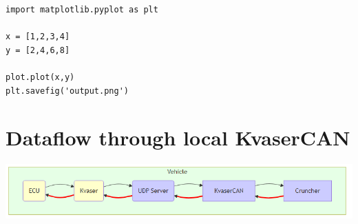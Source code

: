 \documentclass[a4paper, 11pt]{article}
\begin{document}
\begin{verbatim}
import matplotlib.pyplot as plt

x = [1,2,3,4]
y = [2,4,6,8]

plot.plot(x,y)
plt.savefig('output.png')
\end{verbatim}
\section{Dataflow through local KvaserCAN}
\label{sec:orgb2fbc14}

\begin{center}
\includegraphics[width=.9\linewidth]{./img/data_flow_kvaser.png}
\label{Fig. Dataflow through Kvaser}
\end{center}
\end{document}
